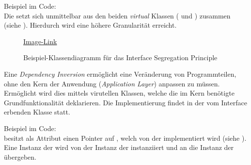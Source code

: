 Beispiel im Code:\\
Die  setzt sich unmittelbar aus den beiden \textit{virtual} Klassen ( und ) zusammen (siehe ). Hierdurch wird eine höhere Granularität erreicht.

\begin{figure}[ht!]
\vspace{0.25cm}
\begin{center}
\caption{Beispiel-Klassendiagramm für das Interface Segregation Principle}
\label{fig:ISP}
\end{center}

\vspace{0.25cm}
\href{https://github.com/MaagMich/SWE2\_Project/blob/c5c3674bd201ee306463881cf711bb2ce9229842/Ausarbeitung/Pictures/InterfaceSegregation.png}{Image-Link}
\end{figure}


Eine \textit{Dependency Inversion} ermöglicht eine Veränderung von Programmteilen, ohne den Kern der Anwendung (\textit{Application Layer}) anpassen zu müssen. Ermöglicht wird dies mittels virutellen Klassen\footnotemark[1], welche die im Kern benötigte Grundfunktionalität deklarieren. Die Implementierung findet in der vom Interface erbenden Klasse statt.

Beispiel im Code:\\
 besitzt als Attribut einen Pointer auf , welch von der  implementiert wird (siehe ). Eine Instanz der  wird von der Instanz der  instanziiert und an die Instanz der  übergeben.

